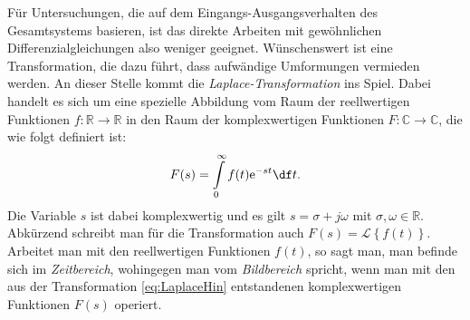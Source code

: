 Für Untersuchungen, die auf dem Eingangs-Ausgangsverhalten des Gesamtsystems basieren, ist das direkte Arbeiten mit gewöhnlichen Differenzialgleichungen also weniger geeignet. Wünschenswert ist eine Transformation, die dazu führt, dass aufwändige Umformungen vermieden werden.
An dieser Stelle kommt die \emph{Laplace-Transformation} ins Spiel. Dabei handelt es sich um eine spezielle Abbildung vom Raum der reellwertigen Funktionen $f : \mathbb{R} \to \mathbb{R}$ in den Raum der komplexwertigen Funktionen $F : \mathbb{C} \to \mathbb{C}$, die wie folgt definiert ist:
\begin{equation} \label{eq:LaplaceHin}
  F(s) = \int\limits_0^\infty f(t)\mathrm{e}^{-st}\df t.
\end{equation}
Die Variable $s$ ist dabei komplexwertig und es gilt $s = \sigma + j \omega$ mit $\sigma, \omega \in \mathbb{R}$.
Abkürzend schreibt man für die Transformation auch $F(s) = \mathcal{L}\left\{f(t)\right\}$.
Arbeitet man mit den reellwertigen Funktionen $f(t)$, so sagt man, man befinde sich im \emph{Zeitbereich}, wohingegen man vom \emph{Bildbereich} spricht, wenn man mit den aus der Transformation \eqref{eq:LaplaceHin} entstandenen komplexwertigen Funktionen $F(s)$ operiert.


